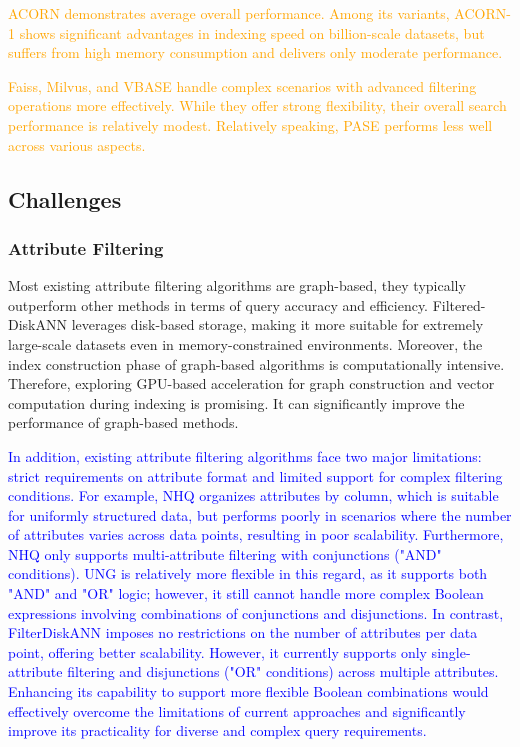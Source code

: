\documentclass[sigconf, nonacm]{acmart}
\begin{document}
\textcolor{orange}{
ACORN demonstrates average overall performance. Among its variants, ACORN-1 shows significant advantages in indexing speed on billion-scale datasets, but suffers from high memory consumption and delivers only moderate performance.}

\textcolor{orange}{
Faiss, Milvus, and VBASE handle complex scenarios with advanced filtering operations more effectively. While they offer strong flexibility, their overall search performance is relatively modest. Relatively speaking, PASE performs less well across various aspects.}
	
	\subsection{Challenges}
	\subsubsection{\textbf{Attribute Filtering}}
	Most existing attribute filtering algorithms are graph-based, they typically outperform other methods in terms of query accuracy and efficiency. Filtered-DiskANN leverages disk-based storage, making it more suitable for extremely large-scale datasets even in memory-constrained environments. Moreover, the index construction phase of graph-based algorithms is computationally intensive. Therefore, exploring GPU-based acceleration for graph construction and vector computation during indexing is promising. It can significantly improve the performance of graph-based methods.
	
	\textcolor{blue}{In addition, existing attribute filtering algorithms face two major limitations: strict requirements on attribute format and limited support for complex filtering conditions. For example, NHQ organizes attributes by column, which is suitable for uniformly structured data, but performs poorly in scenarios where the number of attributes varies across data points, resulting in poor scalability. Furthermore, NHQ only supports multi-attribute filtering with conjunctions ("AND" conditions). UNG is relatively more flexible in this regard, as it supports both "AND" and "OR" logic; however, it still cannot handle more complex Boolean expressions involving combinations of conjunctions and disjunctions.
	In contrast, FilterDiskANN imposes no restrictions on the number of attributes per data point, offering better scalability. However, it currently supports only single-attribute filtering and disjunctions ("OR" conditions) across multiple attributes. Enhancing its capability to support more flexible Boolean combinations would effectively overcome the limitations of current approaches and significantly improve its practicality for diverse and complex query requirements.
		}
		
\end{document}
